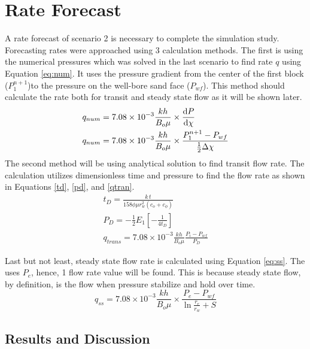 \documentclass[12pt,letterpaper,titlepage]{article}
\begin{document}
\section{Rate Forecast}
A rate forecast of scenario 2 is necessary to complete the simulation study. Forecasting rates were approached using 3 calculation methods. The first is using the numerical pressures which was solved in the last scenario to find rate $q$ using Equation \ref{eq:num}. It uses the pressure gradient from the center of the first block ($P_1^{n+1}$)to the pressure on the well-bore sand face ($P_{wf}$). This method should calculate the rate both for transit and steady state flow as it will be shown later.
 \begin{align}\label{eq:num}
     q_{num} &= 7.08\times 10^{-3}\frac{k h}{B_o \mu}\times \dv{P}{\chi}\nonumber
     \\q_{num} &= 7.08\times 10^{-3}\frac{k h}{B_o \mu}\times \frac{P_1^{n+1}-P_{wf}}{\frac{1}{2}\Delta\chi}
\end{align}
The second method will be using analytical solution to find transit flow rate. The calculation utilizes dimensionless time and pressure to find the flow rate as shown in Equations \ref{td}, \ref{pd}, and \ref{qtran}.
\begin{gather}\label{td}
t_D = \frac{k\,t}{158\phi\mu r_w^2(c_o+c_\phi)}
   \\ P_D = -\frac{1}{2}E_1[-\frac{1}{4t_D}]\label{pd}
    \\q_{trans} = 7.08\times 10^{-3}\frac{k h}{B_o \mu}\frac{P_i-P_{wf}}{P_D}\label{qtran}
    \end{gather}
    
Last but not least, steady state flow rate is calculated using Equation \ref{eq:ss}. The uses $P_e$, hence, 1 flow rate value will be found. This is because steady state flow, by definition, is the flow when pressure stabilize and hold over time.
 \begin{equation}\label{eq:ss}
 q_{ss} = 7.08\times10^{-3}\frac{k h}{B_o \mu}\times \frac{P_e-P_{wf}}{\ln{\frac{r_e}{r_w}+S}}
 \end{equation}

\subsection{Results and Discussion}
\end{document}
